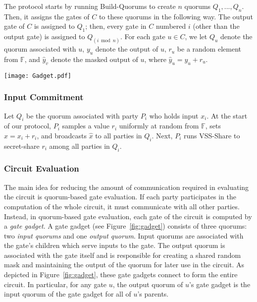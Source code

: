 \documentclass[11pt,letter]{article}
\newcommand{\alg}[1]{\mbox{\textsf{#1}}}
\newcommand{\mask}[1]{\widehat{#1}}
\newcommand{\F}{\mathbb{F}}
\theoremstyle{mytheoremstyle}
\let\savedCaption=\caption
\renewcommand*{\caption}[1]{\savedCaption[#1]{~#1}}
\begin{document}
The protocol starts by running \textsf{Build-Quorums} to create $n$ quorums $Q_1,...,Q_n$. Then, it assigns the gates of $C$ to these quorums in the following way. The output gate of $C$ is assigned to $Q_1$; then, every gate in $C$ numbered $i$ (other than the output gate) is assigned to $Q_{(i \bmod n)}$. For each gate $u \in C$, we let $Q_u$ denote the quorum associated with $u$, $y_u$ denote the output of $u$, $r_u$ be a random element from $\F$, and $\mask{y}_v$ denote the masked output of $u$, where $\mask{y}_u = y_u + r_u$.

\begin{figure*}[t]
	\begin{center}
		\texttt{[image: Gadget.pdf]}
	\end{center}
	\caption{The gate gadgets for gate $u$ and its left and right children}
	\label{fig:gadget}
\end{figure*}













\subsubsection{Input Commitment}
Let $Q_i$ be the quorum associated with party $P_i$ who holds input $x_i$. At the start of our protocol, $P_i$ samples a value $r_i$ uniformly at random from $\F$, sets $\mask{x} = x_i + r_i$, and broadcasts $\mask{x}$ to all parties in $Q_i$. Next, $P_i$ runs \alg{VSS-Share} to secret-share $r_i$ among all parties in $Q_i$.

\subsubsection{Circuit Evaluation} \label{sec:gateEvaluation}
The main idea for reducing the amount of communication required in evaluating the circuit is  quorum-based gate evaluation. If each party participates in the computation of the whole circuit, it must communicate with all other parties. Instead, in quorum-based gate evaluation, each gate of the circuit is computed by a \emph{gate gadget}. A gate gadget (see Figure~\ref{fig:gadget}) consists of three quorums: two \emph{input quorums} and one \emph{output quorum}. Input quorums are associated with the gate's children which serve inputs to the gate. The output quorum is associated with the gate itself and is responsible for creating a shared random mask and maintaining the output of the quorum for later use in the circuit. As depicted in Figure~\ref{fig:gadget}, these gate gadgets connect to form the entire circuit. In particular, for any gate $u$, the output quorum of $u$'s gate gadget is the input quorum of the gate gadget for all of $u$'s parents.
\end{document}
